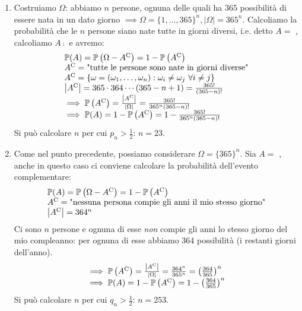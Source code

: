 \begin{enumerate}
	\item Costruiamo $\Omega $: abbiamo $n$ persone, ognuna delle quali ha $365$ possibilità di essere nata in un dato giorno $\implies \Omega =\{1,\dots,365\}^{n} ,| \Omega | =365^{n}$. Calcoliamo la probabilità che le $n$ persone siano nate tutte in giorni diversi, i.e. detto $A=$ , calcoliamo $A\comp$ e avremo:
	\begin{equation*}
		\begin{array}{ l }
			\mathbb{P}(A) =\mathbb{P}\left(\Omega -A^{\mathrm{C}}\right) =1-\mathbb{P}\left(A^{\mathrm{C}}\right)\\
			A^{\mathrm{C}} =\text{"tutte le persone sono nate in giorni diverse"}\\
			A^{\mathrm{C}} =\{\omega =(\omega_{1} ,\dots ,\omega_{n}) :\omega_{i} \neq \omega_{j} \ \forall i\neq j\}\\
			\left| A^{\mathrm{C}}\right| =365\cdot 364\cdots (365-n+1) =\frac{365!}{(365-n) !}\\
			\implies \mathbb{P}\left(A^{\mathrm{C}}\right) =\frac{\left| A^{\mathrm{C}}\right| }{| \Omega | } =\frac{365!}{365^{n}(365-n) !}\\
			\implies \mathbb{P}(A) =1-\mathbb{P}\left(A^{\mathrm{C}}\right) =1-\frac{365!}{365^{n}(365-n) !}
		\end{array}
	\end{equation*}
	Si può calcolare $n$ per cui $p_{n}  >\frac{1}{2}$: $n=23$.
	\item Come nel punto precedente, possiamo considerare $\Omega =\{365\}^{n}$. Sia $A=$ , anche in questo caso ci conviene calcolare la probabilità dell'evento complementare:
	\begin{equation*}
		\begin{array}{ l }
			\mathbb{P}(A) =\mathbb{P}\left(\Omega -A^{\mathrm{C}}\right) =1-\mathbb{P}\left(A^{\mathrm{C}}\right)\\
			A^{\mathrm{C}} =\text{"nessuna persona compie gli anni il mio stesso giorno"}\\
			\left| A^{\mathrm{C}}\right| =364^{n}
		\end{array}
	\end{equation*}
	Ci sono $n$ persone e ognuna di esse \textit{non} compie gli anni lo stesso giorno del mio compleanno: per ognuna di esse abbiamo $364$ possibilità (i restanti giorni dell'anno).
	\begin{equation*}
		\begin{array}{ l }
			\implies \mathbb{P}\left(A^{\mathrm{C}}\right) =\frac{\left| A^{\mathrm{C}}\right| }{| \Omega | } =\frac{364^{n}}{365^{n}} =\left(\frac{364}{365}\right)^{n}\\
			\implies \mathbb{P}(A) =1-\mathbb{P}\left(A^{\mathrm{C}}\right) =1-\left(\frac{364}{365}\right)^{n}
		\end{array}
	\end{equation*}
	Si può calcolare $n$ per cui $q_{n}  >\frac{1}{2}$: $n=253$.
\end{enumerate}

